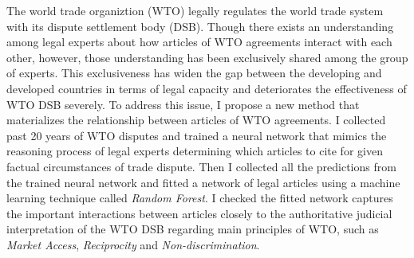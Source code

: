The world trade organiztion (WTO) legally regulates the world trade system with its dispute settlement body (DSB).
Though there exists an understanding among legal experts about how articles of WTO agreements interact with each other, %
however, those understanding has been exclusively shared among the group of experts.  %
This exclusiveness has widen the gap
between the developing and developed countries in terms of
legal capacity and deteriorates the effectiveness of WTO DSB severely.
To address this issue, I propose a new method that materializes the relationship between articles of WTO agreements. %
I collected past 20 years of WTO disputes and trained a neural network that mimics the reasoning process of legal experts determining which articles to cite for given factual circumstances of trade dispute.
Then I collected all the predictions from the trained neural network and fitted a network of legal articles using a machine learning technique called \textit{Random Forest}.
I checked the fitted network captures the important interactions between articles closely to the authoritative judicial interpretation of the WTO DSB regarding main principles of WTO, such as \textit{Market Access}, \textit{Reciprocity} and \textit{Non-discrimination}.
















